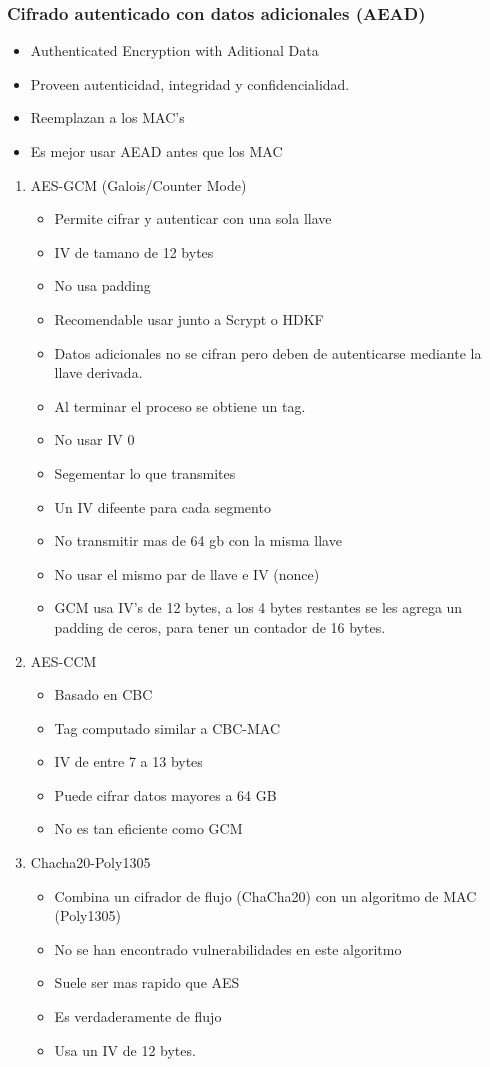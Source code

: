 \documentclass[11pt]{article}
\begin{document}
\subsubsection{Cifrado autenticado con datos adicionales (AEAD)}
\label{sec:org1877eaa}
\begin{itemize}
\item Authenticated Encryption with Aditional Data
\item Proveen autenticidad, integridad y confidencialidad.
\item Reemplazan a los MAC's
\item Es mejor usar AEAD antes que los MAC
\end{itemize}
\begin{enumerate}
\item AES-GCM (Galois/Counter Mode)
\label{sec:orga23cdd9}
\begin{itemize}
\item Permite cifrar y autenticar con una sola llave
\item IV de tamano de 12 bytes
\item No usa padding
\item Recomendable usar junto a Scrypt o HDKF
\item Datos adicionales no se cifran pero deben de autenticarse mediante la llave derivada.
\item Al terminar el proceso se obtiene un tag.

\item No usar IV 0
\item Segementar lo que transmites
\item Un IV difeente para cada segmento
\item No transmitir mas de 64 gb con la misma llave
\item No usar el mismo par de llave e IV (nonce)

\item GCM usa IV's de 12 bytes, a los 4 bytes restantes se les agrega un padding de ceros, para tener un contador de 16 bytes.
\end{itemize}
\item AES-CCM
\label{sec:orgeaabaa6}
\begin{itemize}
\item Basado en CBC
\item Tag computado similar a CBC-MAC
\item IV de entre 7 a 13 bytes
\item Puede cifrar datos mayores a 64 GB
\item No es tan eficiente como GCM
\end{itemize}
\item Chacha20-Poly1305
\label{sec:orge0d1fc2}
\begin{itemize}
\item Combina un cifrador de flujo (ChaCha20) con un algoritmo de MAC (Poly1305)
\item No se han encontrado vulnerabilidades en este algoritmo
\item Suele ser mas rapido que AES
\item Es verdaderamente de flujo
\item Usa un IV de 12 bytes.
\end{itemize}
\end{enumerate}
\end{document}
